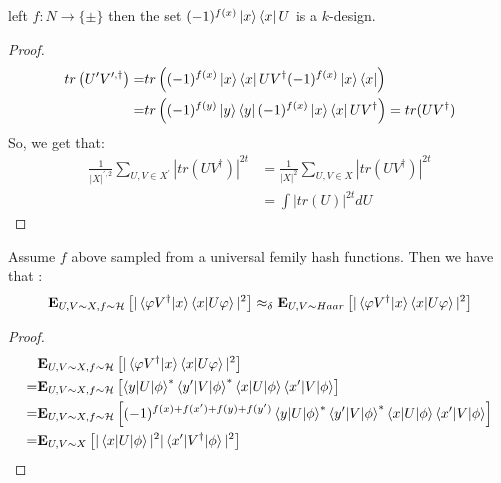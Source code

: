 \documentclass[manuscript,screen,review]{acmart}
\begin{document}
\begin{claim}
  left $f : N \rightarrow \{ \pm \}$ then the set $ (-1)^{f(x)}\ket{x}\bra{x}U$ is a $k$-design. 
\end{claim}
\begin{proof}
  \begin{equation*}
    \begin{split}
      tr\left( U^{\prime}V^{\prime,\dagger} \right)  = & tr\left( (-1)^{f(x)}\ket{x}\bra{x}UV^{\dagger} (-1)^{f(x)}\ket{x}\bra{x} \right) \\ 
  = & tr\left( (-1)^{f(y)}\ket{y}\bra{y}(-1)^{f(x)}\ket{x}\bra{x}UV^{\dagger} \right) = tr(UV^{\dagger})  
    \end{split}
  \end{equation*}
  So, we get that:
  \begin{equation*}
    \begin{split}
      \frac{1}{|X|^{\prime, 2}}\sum_{U,V\in X^{\prime}}{ |tr(UV^{\dagger} )|^{2t} } & =  \frac{1}{|X|^{2}}\sum_{U,V\in X}{ |tr(UV^{\dagger} )|^{2t} }\\
      & = \int{ |tr(U)|^{2t} dU} 
    \end{split}
  \end{equation*}
\end{proof}

\begin{claim}
  Assume $f$ above sampled from a universal femily hash functions. Then we have that :  
  \begin{equation*}
    \begin{split}
    \exppm{ |\braket{\varphi V^{\dagger}|x}\braket{x|U\varphi}|^{2} }{U,V \sim X , f\sim \mathcal{H}} \approx_{\delta} \exppm{ |\braket{\varphi V^{\dagger}|x}\braket{x|U\varphi}|^{2} }{U,V \sim Haar }
    \end{split}
  \end{equation*}
\end{claim}

\begin{proof}
 

  \begin{equation*}
    \begin{split}
& \exppm{ |\braket{\varphi V^{\dagger}|x}\braket{x|U\varphi}|^{2} }{U,V \sim X , f\sim \mathcal{H}}  \\ 
= & \exppm{ \braket{y|U|\phi}^{*} \braket{y^{\prime}|V|\phi}^{*} \braket{x|U|\phi} \braket{x^{\prime}|V|\phi}}{ U,V \sim X , f\sim \mathcal{H}} \\
= & \exppm{ (-1)^{f(x)+f(x^{\prime})+f(y)+f(y^{\prime})} \braket{y|U|\phi}^{*} \braket{y^{\prime}|V|\phi}^{*} \braket{x|U|\phi} \braket{x^{\prime}|V|\phi}}{ U,V \sim X , f\sim \mathcal{H}} \\
= & \exppm{|\braket{x|U|\phi}|^{2}  |\braket{x^{\prime}|V^{\dagger}|\phi}|^{2} }{ U,V \sim X } 
    \end{split}
  \end{equation*}


\end{proof}
\end{document}
